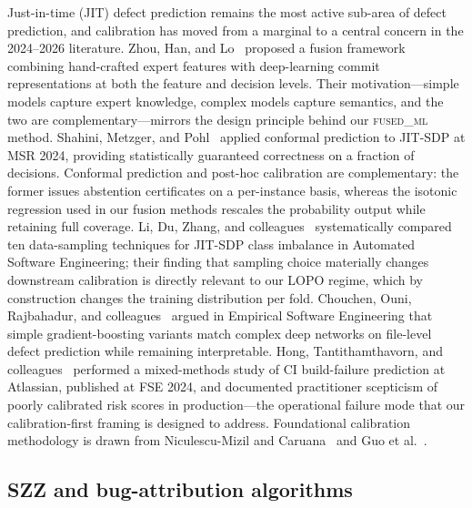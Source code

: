 \documentclass[preprint,12pt]{elsarticle}
\begin{document}
Just-in-time (JIT) defect prediction remains the most active sub-area of defect prediction, and calibration has moved from a marginal to a central concern in the 2024--2026 literature. Zhou, Han, and Lo~\cite{zhou2025bridging} proposed a fusion framework combining hand-crafted expert features with deep-learning commit representations at both the feature and decision levels. Their motivation---simple models capture expert knowledge, complex models capture semantics, and the two are complementary---mirrors the design principle behind our \textsc{fused\_ml} method. Shahini, Metzger, and Pohl~\cite{shahini2024conformal} applied conformal prediction to JIT-SDP at MSR 2024, providing statistically guaranteed correctness on a fraction of decisions. Conformal prediction and post-hoc calibration are complementary: the former issues abstention certificates on a per-instance basis, whereas the isotonic regression used in our fusion methods rescales the probability output while retaining full coverage. Li, Du, Zhang, and colleagues~\cite{li2024sampling} systematically compared ten data-sampling techniques for JIT-SDP class imbalance in Automated Software Engineering; their finding that sampling choice materially changes downstream calibration is directly relevant to our LOPO regime, which by construction changes the training distribution per fold. Chouchen, Ouni, Rajbahadur, and colleagues~\cite{chouchen2026lessismore} argued in Empirical Software Engineering that simple gradient-boosting variants match complex deep networks on file-level defect prediction while remaining interpretable. Hong, Tantithamthavorn, and colleagues~\cite{hong2024atlassian} performed a mixed-methods study of CI build-failure prediction at Atlassian, published at FSE 2024, and documented practitioner scepticism of poorly calibrated risk scores in production---the operational failure mode that our calibration-first framing is designed to address. Foundational calibration methodology is drawn from Niculescu-Mizil and Caruana~\cite{niculescu2005predicting} and Guo et al.~\cite{guo2017calibration}.

\subsection{SZZ and bug-attribution algorithms}
\end{document}
